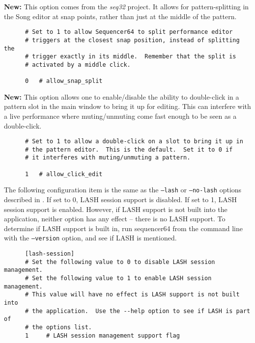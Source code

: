    \textbf{New:}
   This option comes from the \textsl{seq32} project.  It allows for
   pattern-splitting in the Song editor at snap points, rather than just
   at the middle of the pattern.

   \begin{verbatim}
      # Set to 1 to allow Sequencer64 to split performance editor
      # triggers at the closest snap position, instead of splitting the
      # trigger exactly in its middle.  Remember that the split is
      # activated by a middle click.

      0   # allow_snap_split
   \end{verbatim}

   \textbf{New:}
   This option allows one to enable/disable the ability to double-click
   in a pattern slot in the main window to bring it up for editing.  This
   can interfere with a live performance where muting/unmuting come fast enough
   to be seen as a double-click.

   \begin{verbatim}
      # Set to 1 to allow a double-click on a slot to bring it up in
      # the pattern editor.  This is the default.  Set it to 0 if
      # it interferes with muting/unmuting a pattern.

      1   # allow_click_edit
   \end{verbatim}

   The following configuration item is the same as the
   \texttt{--lash} or \texttt{--no-lash} options described in
   .
   If set to 0, LASH session support is disabled.
   If set to 1, LASH session support is enabled.
   However, if LASH support is not built into the application, neither option
   has any effect -- there is no LASH support.  
   To determine if LASH support is built in, run sequencer64 from the command
   line with the \texttt{--version} option, and see if LASH is mentioned.

   \begin{verbatim}
      [lash-session]
      # Set the following value to 0 to disable LASH session management.
      # Set the following value to 1 to enable LASH session management.
      # This value will have no effect is LASH support is not built into
      # the application.  Use the --help option to see if LASH is part of
      # the options list.
      1     # LASH session management support flag
   \end{verbatim}

